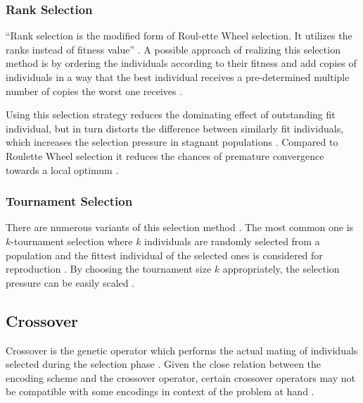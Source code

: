 \documentclass[sigconf]{acmart}
\begin{document}
\subsubsection{Rank Selection}
\enquote{Rank selection is the modified form of Roul-ette Wheel selection.
It utilizes the ranks instead of fitness value} \cite{Katoch2021}.
A possible approach of realizing this selection method is by ordering the
individuals according to their fitness and add copies of individuals in a way
that the best individual receives a pre-determined multiple number of copies
the worst one receives \cite{Affenzeller2009}.

Using this selection strategy reduces the dominating effect of outstanding fit
individual, but in turn distorts the difference between similarly fit
individuals, which increases the selection pressure in stagnant populations
\cite{Affenzeller2009}.
Compared to Roulette Wheel selection it reduces the chances of premature
convergence towards a local optimum \cite{Katoch2021}.

\subsubsection{Tournament Selection}
There are numerous variants of this selection method \cite{Affenzeller2009}.
The most common one is $k$-tournament selection where $k$ individuals are
randomly selected from a population and the fittest individual of the selected
ones is considered for reproduction \cite{Affenzeller2009}.
By choosing the tournament size $k$ appropriately, the selection pressure
can be easily scaled \cite{Affenzeller2009}.



\subsection{Crossover}
Crossover is the genetic operator which performs the actual mating of
individuals selected during the selection phase \cite{Beligiannis2009}.
Given the close relation between the encoding scheme and the crossover operator,
certain crossover operators may not be compatible with some encodings in context
of the problem at hand \cite{Affenzeller2009}.
\end{document}
